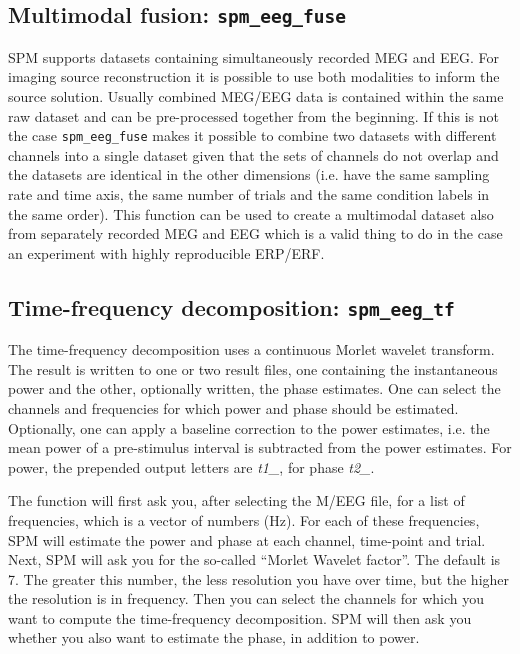\subsection{Multimodal fusion: \texttt{spm\_eeg\_fuse}}
SPM supports datasets containing simultaneously recorded MEG and EEG. For imaging source reconstruction it is possible to use both modalities to inform the source solution. Usually combined MEG/EEG data is contained within the same raw dataset and can be pre-processed together from the beginning. If this is not the case \texttt{spm\_eeg\_fuse} makes it possible to combine two datasets with different channels into a single dataset given that the sets of channels do not overlap and the datasets are identical in the other dimensions (i.e. have the same sampling rate and time axis, the same number of trials and the same condition labels in the same order). This function can be used to create a multimodal dataset also from separately recorded MEG and EEG which is a valid thing to do in the case an experiment with highly reproducible ERP/ERF.

\subsection{Time-frequency decomposition: \texttt{spm\_eeg\_tf}\label{sec:tf}}
The time-frequency decomposition uses a continuous Morlet wavelet transform. The result is written to one or two result files, one containing the instantaneous power and the other, optionally written, the phase estimates. One can select the channels and frequencies for which power and phase should be estimated. Optionally, one can apply a baseline correction to the power estimates, i.e. the mean power of a pre-stimulus interval is subtracted from the power estimates. For power, the prepended output letters are \textit{t1\_}, for phase \textit{t2\_}.

The function will first ask you, after selecting the M/EEG file, for a list of frequencies, which is a vector of numbers (Hz).  For each of these frequencies, SPM will estimate the power and phase at each channel, time-point and trial. Next, SPM will ask you for the so-called ``Morlet Wavelet factor''. The default is 7. The greater this number, the less resolution you  have over time, but the higher the resolution is in frequency. Then you can select the channels for which you want to compute the time-frequency decomposition. SPM will then ask you whether you also want to estimate the phase, in addition to power. 

